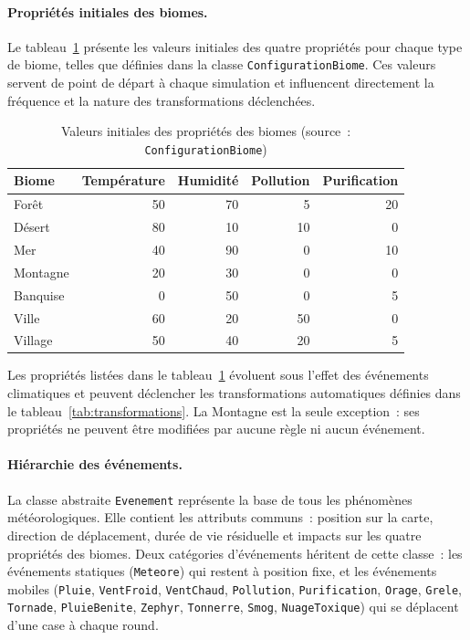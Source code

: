 \paragraph{Propriétés initiales des biomes.}
Le tableau~\ref{tab:biomes_init} présente les valeurs initiales des quatre
propriétés pour chaque type de biome, telles que définies dans la classe
\texttt{ConfigurationBiome}. Ces valeurs servent de point de départ à chaque
simulation et influencent directement la fréquence et la nature des transformations
déclenchées.

\begin{table}[htbp]
  \centering
  \caption{Valeurs initiales des propriétés des biomes (source~: \texttt{ConfigurationBiome})}
  \label{tab:biomes_init}
  \begin{tabular}{lrrrr}
    \toprule
    \textbf{Biome} & \textbf{Température} & \textbf{Humidité} & \textbf{Pollution} & \textbf{Purification} \\
    \midrule
    Forêt      & 50 & 70 &  5 & 20 \\
    Désert     & 80 & 10 & 10 &  0 \\
    Mer        & 40 & 90 &  0 & 10 \\
    Montagne   & 20 & 30 &  0 &  0 \\
    Banquise   &  0 & 50 &  0 &  5 \\
    Ville      & 60 & 20 & 50 &  0 \\
    Village    & 50 & 40 & 20 &  5 \\
    \bottomrule
  \end{tabular}
\end{table}

Les propriétés listées dans le tableau~\ref{tab:biomes_init} évoluent sous l'effet
des événements climatiques et peuvent déclencher les transformations automatiques
définies dans le tableau~\ref{tab:transformations}. La Montagne est la seule
exception~: ses propriétés ne peuvent être modifiées par aucune règle ni aucun
événement.

\paragraph{Hiérarchie des événements.}
La classe abstraite \texttt{Evenement} représente la base de tous les phénomènes
météorologiques. Elle contient les attributs communs~: position sur la carte,
direction de déplacement, durée de vie résiduelle et impacts sur les quatre
propriétés des biomes. Deux catégories d'événements héritent de cette classe~:
les événements statiques (\texttt{Meteore}) qui restent à position fixe, et les
événements mobiles (\texttt{Pluie}, \texttt{VentFroid}, \texttt{VentChaud},
\texttt{Pollution}, \texttt{Purification}, \texttt{Orage}, \texttt{Grele},
\texttt{Tornade}, \texttt{PluieBenite}, \texttt{Zephyr}, \texttt{Tonnerre},
\texttt{Smog}, \texttt{NuageToxique}) qui se déplacent d'une case à chaque round.
